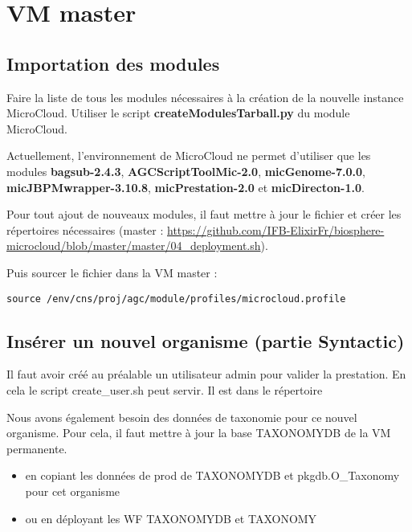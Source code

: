 \section{VM master}

\subsection{Importation des modules}
Faire la liste de tous les modules nécessaires à la création de la nouvelle instance MicroCloud.
Utiliser le script \textbf{createModulesTarball.py} du module MicroCloud.

Actuellement, l'environnement de MicroCloud ne permet d'utiliser que les modules \textbf{bagsub-2.4.3}, \textbf{AGCScriptToolMic-2.0}, \textbf{micGenome-7.0.0}, \textbf{micJBPMwrapper-3.10.8}, \textbf{micPrestation-2.0} et \textbf{micDirecton-1.0}.
\newline

\begin{mycolorbox}
	Pour tout ajout de nouveaux modules, il faut mettre à jour le fichier  et créer les répertoires nécessaires (master : \url{https://github.com/IFB-ElixirFr/biosphere-microcloud/blob/master/master/04_deployment.sh}).
\end{mycolorbox}

Puis sourcer le fichier  dans la VM master :
\begin{lstlisting}[style=bash]
source /env/cns/proj/agc/module/profiles/microcloud.profile
\end{lstlisting}

\subsection{Insérer un nouvel organisme (partie Syntactic)}
Il faut avoir créé au préalable un utilisateur admin pour valider la prestation. En cela le script create\_user.sh peut servir.
Il est dans le répertoire 

Nous avons également besoin des données de taxonomie pour ce nouvel organisme. Pour cela, il faut mettre à jour la base TAXONOMYDB de la VM permanente.
\begin{itemize}
    \item en copiant les données de prod de TAXONOMYDB et pkgdb.O\_Taxonomy pour cet organisme
    \item ou en déployant les WF TAXONOMYDB et TAXONOMY
\end{itemize}


